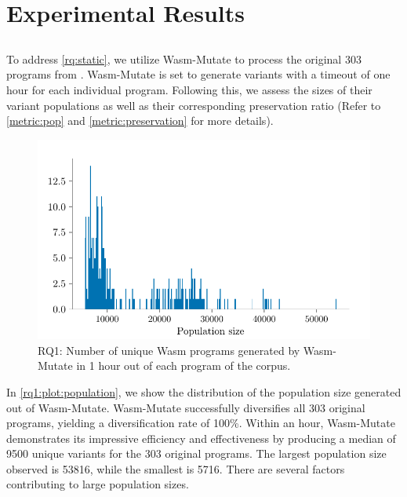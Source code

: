 \documentclass[sigplan,screen]{acmart}
\newcommand{\tool}{{\sc Wasm-Mutate}\xspace}
\newcommand{\wasm}{Wasm\xspace}
\begin{document}
\section{Experimental Results}
\label{results}

\subsection{\rqstatic}
\label{rq:static:results}

\newcommand{\preserved}{62\%\xspace}

To address \ref{rq:static}, we utilize \tool to process the original 303 programs from \cite{arteaga2020crow}. 
\tool is set to generate variants with a timeout of one hour for each individual program. 
Following this, we assess the sizes of their variant populations as well as their corresponding preservation ratio (Refer to \autoref{metric:pop} and \autoref{metric:preservation} for more details).

\begin{figure}
    \centering
    \includegraphics[width=\linewidth]{plots/rq1/population.pdf}
    \caption{RQ1: Number of unique \wasm programs generated by \tool in 1 hour out of each program of the corpus.}
  \label{rq1:plot:population}
\end{figure}


In \autoref{rq1:plot:population}, we show the distribution of the population size generated out of \tool.
\tool successfully diversifies all 303 original programs, yielding a diversification rate of 100\%. 
Within an hour, \tool demonstrates its impressive efficiency and effectiveness by producing a median of 9500 unique variants for the 303 original programs.
The largest population size observed is 53816, while the smallest is 5716.
There are several factors contributing to large population sizes. 
\end{document}
